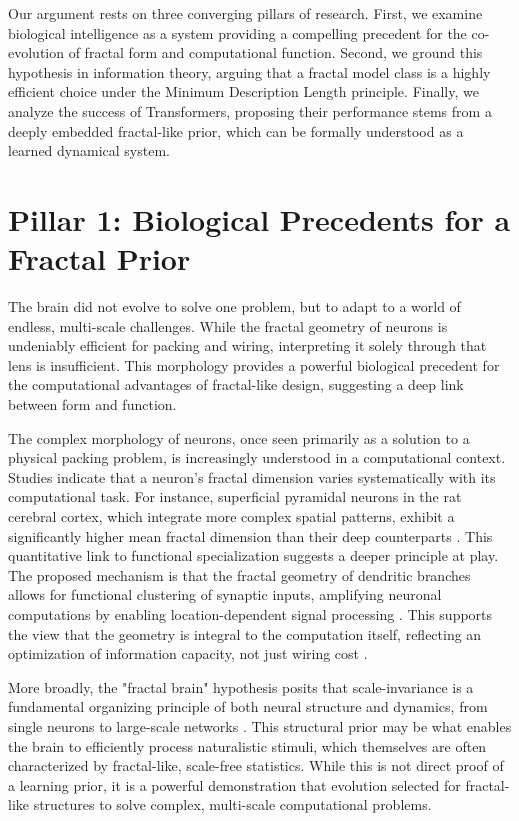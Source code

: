 \documentclass[11pt,a4paper]{article}
\begin{document}
Our argument rests on three converging pillars of research. First, we examine biological intelligence as a system providing a compelling precedent for the co-evolution of fractal form and computational function. Second, we ground this hypothesis in information theory, arguing that a fractal model class is a highly efficient choice under the Minimum Description Length principle. Finally, we analyze the success of Transformers, proposing their performance stems from a deeply embedded fractal-like prior, which can be formally understood as a learned dynamical system.

\section{Pillar 1: Biological Precedents for a Fractal Prior}
The brain did not evolve to solve one problem, but to adapt to a world of endless, multi-scale challenges. While the fractal geometry of neurons is undeniably efficient for packing and wiring, interpreting it solely through that lens is insufficient. This morphology provides a powerful biological precedent for the computational advantages of fractal-like design, suggesting a deep link between form and function.

The complex morphology of neurons, once seen primarily as a solution to a physical packing problem, is increasingly understood in a computational context. Studies indicate that a neuron's fractal dimension varies systematically with its computational task. For instance, superficial pyramidal neurons in the rat cerebral cortex, which integrate more complex spatial patterns, exhibit a significantly higher mean fractal dimension than their deep counterparts \citep{jelinek2015differences}. This quantitative link to functional specialization suggests a deeper principle at play. The proposed mechanism is that the fractal geometry of dendritic branches allows for functional clustering of synaptic inputs, amplifying neuronal computations by enabling location-dependent signal processing \citep{ecker2023dendritic}. This supports the view that the geometry is integral to the computation itself, reflecting an optimization of information capacity, not just wiring cost \citep{smith2021neurons}.

More broadly, the "fractal brain" hypothesis posits that scale-invariance is a fundamental organizing principle of both neural structure and dynamics, from single neurons to large-scale networks \citep{grosu2023fractal}. This structural prior may be what enables the brain to efficiently process naturalistic stimuli, which themselves are often characterized by fractal-like, scale-free statistics. While this is not direct proof of a learning prior, it is a powerful demonstration that evolution selected for fractal-like structures to solve complex, multi-scale computational problems.
\end{document}

